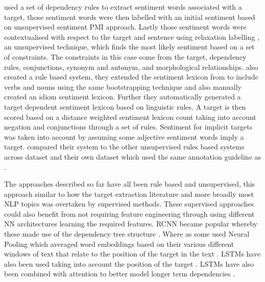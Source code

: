 \citet{popescu-etzioni-2005-extracting} used a set of dependency rules to extract sentiment words associated with a target, those sentiment words were then labelled with an initial sentiment based on \citet{turney-2002-thumbs} unsupervised sentiment PMI \citep{church-hanks-1989-word} approach. Lastly those sentiment words were contextualised with respect to the target and sentence using relaxation labelling \citep{hummel1983foundations}, an unsupervised technique, which finds the most likely sentiment based on a set of constraints. The constraints in this case come from the target, dependency rules, conjunctions, synonym and antonym, and morphological relationships. \citet{ding2008holistic} also created a rule based system, they extended the sentiment lexicon from \citet{hu2004mining} to include verbs and nouns using the same bootstrapping technique and also manually created an idiom sentiment lexicon. Further they automatically generated a target dependent sentiment lexicon based on linguistic rules. A target is then scored based on a distance weighted sentiment lexicon count taking into account negation and conjunctions through a set of rules. Sentiment for implicit targets was taken into account by assuming some adjective sentiment words imply a target. \citet{ding2008holistic} compared their system to the other unsupervised rules based systems \citep{hu2004mining, popescu-etzioni-2005-extracting} across \citet{hu2004mining} dataset and their own dataset which used the same annotation guideline as \citet{hu2004mining}.

The approaches described so far have all been rule based and unsupervised, this approach similar to how the target extraction literature and more broadly most NLP topics was overtaken by supervised methods. These supervised approaches could also benefit from not requiring feature engineering through using different NN architectures learning the required features. RCNN became popular whereby these made use of the dependency tree structure \citep{dong-etal-2014-adaptive, nguyen-shirai-2015-phrasernn}. Where as some used Neural Pooling which averaged word embeddings based on their various different windows of text that relate to the position of the target in the text \citep{vo2015target, wang-etal-2017-tdparse}. LSTMs have also been used taking into account the position of the target \citep{tang-etal-2016-effective}. LSTMs have also been combined with attention to better model longer term dependencies \citep{wang-etal-2016-attention, chen-etal-2017-recurrent}.


